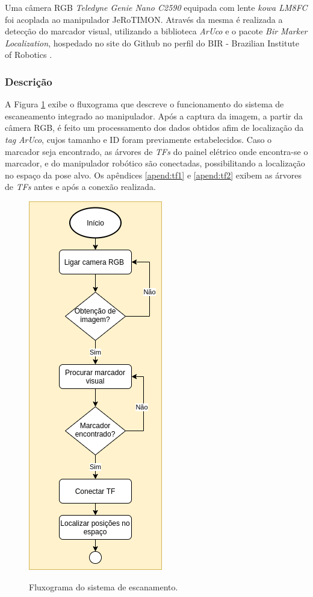Uma câmera RGB \textit{Teledyne Genie Nano C2590} equipada com lente \textit{kowa LM8FC} foi acoplada ao manipulador JeRoTIMON. Através da mesma é realizada a detecção do marcador visual, utilizando a biblioteca \textit{ArUco} e o pacote \textit{Bir Marker Localization}, hospedado no site do Github no perfil do BIR - Brazilian Institute of Robotics \cite{birmarker}. 

\subsubsection{Descrição} 
\label{ssub:descA}
 
A Figura \ref{fig:flux_vis} exibe o fluxograma que descreve o funcionamento do sistema de escaneamento integrado ao manipulador. Após a captura  da imagem, a partir da câmera RGB, é feito um processamento dos dados obtidos afim de localização da \textit{tag} \textit{ArUco}, cujos tamanho e ID foram previamente estabelecidos. Caso o marcador seja encontrado, as árvores de \textit{TFs} do painel elétrico onde encontra-se o marcador, e do manipulador robótico são conectadas, possibilitando a localização no espaço da pose alvo. Os apêndices \ref{apend:tf1} e \ref{apend:tf2} exibem as árvores de \textit{TFs} antes e após a conexão realizada.

\begin{figure}[!ht]
  \caption{Fluxograma do sistema de escanamento.}
  \centering
  \includegraphics[scale=0.6]{images/fluxograma_sis_vis.png}
  \label{fig:flux_vis}
\end{figure}


